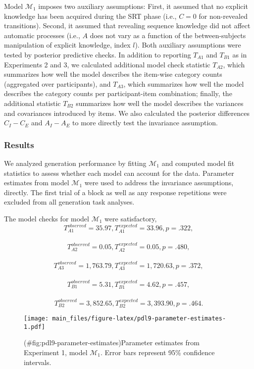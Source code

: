 \begin{appendix}
Model \(\mathcal{M}_1\) imposes two auxiliary assumptions: First, it
assumed that no explicit knowledge has been acquired during the SRT
phase (i.e., \(C=0\) for non-revealed transitions). Second, it assumed
that revealing sequence knowledge did not affect automatic processes
(i.e., \(A\) does not vary as a function of the between-subjects
manipulation of explicit knowledge, index \(l\)). Both auxiliary
assumptions were tested by posterior predictive checks. In addition to
reporting \(T_{A1}\) and \(T_{B1}\) as in Experiments 2 and 3, we
calculated additional model check statistic \(T_{A2}\), which summarizes
how well the model describes the item-wise category counts (aggregated
over participants), and \(T_{A3}\), which summarizes how well the model
describes the category counts per participant-item combination; finally,
the additional statistic \(T_{B2}\) summarizes how well the model
describes the variances and covariances introduced by items. We also
calculated the posterior differences \(C_I - C_E\) and \(A_I - A_E\) to
more directly test the invariance assumption.

\hypertarget{results}{%
\subsubsection{Results}\label{results}}

We analyzed generation performance by fitting \(\mathcal{M}_1\) and
computed model fit statistics to assess whether each model can account
for the data. Parameter estimates from model \(\mathcal{M}_1\) were used
to address the invariance assumptions, directly. The first trial of a
block as well as any response repetitions were excluded from all
generation task analyses.

The model checks for model \(\mathcal{M}_1\) were satisfactory,
\[T_{A1}^{observed} = 35.97, T_{A1}^{expected} = 33.96, p = .322,\]~
\[T_{A2}^{observed} = 0.05, T_{A2}^{expected} = 0.05, p = .480,\]~
\[T_{A3}^{observed} = 1,763.79, T_{A3}^{expected} = 1,720.63, p = .372,\]~
\[T_{B1}^{observed} = 5.31, T_{B1}^{expected} = 4.62, p = .457,\]~
\[T_{B2}^{observed} = 3,852.65, T_{B2}^{expected} = 3,393.90, p = .464.\]

\begin{figure}
\centering
\texttt{[image: main\_files/figure-latex/pdl9-parameter-estimates-1.pdf]}
\caption{(\#fig:pdl9-parameter-estimates)Parameter estimates from
Experiment 1, model \(\mathcal{M}_1\). Error bars represent 95\%
confidence intervals.}
\end{figure}


\end{appendix}
